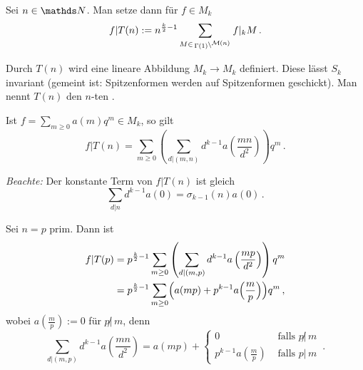 \begin{defi}
Sei $n \in \NN$. Man setze dann für $f \in M_k$
\[
f | T(n) := n^{\frac k2 - 1} \sum_{M \in \linksmodulo{\Gamma(1)}{\mathcal M (n)}} f |_k M
\,.
\]
\end{defi}

\begin{satz-list}\label{TnEndoMk}
\item Durch $T(n)$ wird eine lineare Abbildung $M_k \to M_k$ definiert. Diese lässt $S_k$ invariant (gemeint ist: Spitzenformen werden auf Spitzenformen geschickt). Man nennt $T(n)$ den $n$-ten .
\item Ist $f = \sum_{m \geq 0} a(m) q^m \in M_k$, so gilt
\[
f | T(n) = \sum_{m \geq 0} \left( \sum_{d | (m,n)} d^{k-1} a\left(\frac{mn}{d^2}\right) \right) q^m
\,.
\]

\emph{Beachte:} Der konstante Term von $f | T(n)$ ist gleich
\[
\sum_{d|n} d^{k-1} a(0) = \sigma_{k-1}(n) a(0)
\,.
\]
\end{satz-list}

\begin{bsp}
Sei $n = p$ prim. Dann ist
\begin{align*}
f | T(p) &= p^{\frac k2 - 1} \sum_{m \geq 0} \left( \sum_{d | (m,p)} d^{k-1} a\left(\frac{mp}{d^2}\right) \right) q^m\\
&= p^{\frac k2 - 1} \sum_{m \geq 0} \Bigl( a(mp) + p^{k-1} a\Bigl( \frac mp\Bigr) \Bigr) q^m
\,,
\end{align*}
wobei $a\left(\frac mp\right) := 0$ für $p \!\! \not | \, m$, denn
\[
\sum_{d | (m,p)} d^{k-1} a \left( \frac {mn}{d^2} \right) = a(mp) + 
\begin{cases}
0 & \text{ falls } p \!\! \not | \, m\\ 
p^{k-1} a \left(\frac mp \right) & \text{ falls } p | \, m
\end{cases}
\,.
\]
\end{bsp}

